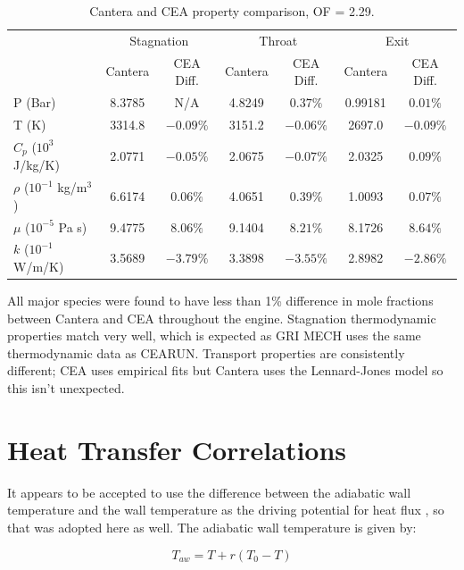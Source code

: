 \documentclass[11pt]{article}
\begin{document}
\begin{table}[H]
  \centering
  \caption{Cantera and CEA property comparison, OF = 2.29.}
  \begin{tabular}{l c c c c c c}
    \toprule
    & \multicolumn{2}{c}{Stagnation} & \multicolumn{2}{c}{Throat} & \multicolumn{2}{c}{Exit} \\
    \cmidrule(lr){2-3} \cmidrule(lr){4-5} \cmidrule(lr){6-7}
    & Cantera & CEA Diff. & Cantera & CEA Diff. & Cantera & CEA Diff. \\
    \midrule
    P (Bar) & 8.3785 & N/A & 4.8249 & $0.37\%$ & 0.99181 & $0.01\%$ \\
    T (K) & 3314.8 & $-0.09\%$ & 3151.2 & $-0.06\%$ & 2697.0 & $-0.09\%$ \\
    $C_p$ ($10^3$ J/kg/K) & 2.0771 & $-0.05\%$ & 2.0675 & $-0.07\%$ & 2.0325 & $0.09\%$ \\
    $\rho$ ($10^{-1}$ kg/m$^3$) & 6.6174 & $0.06\%$ & 4.0651 & $0.39\%$ & 1.0093 & $0.07\%$\\
    $\mu$ ($10^{-5}$ Pa s) & 9.4775 & $8.06\%$ & 9.1404 & $8.21\%$ & 8.1726 & $8.64\%$ \\
    $k$ ($10^{-1}$ W/m/K) & 3.5689 & $-3.79\%$ & 3.3898 & $-3.55\%$ & 2.8982 & $-2.86\%$\\
    \bottomrule
  \end{tabular}
\end{table}

All major species were found to have less than 1\% difference in mole fractions between Cantera and CEA throughout the engine. Stagnation thermodynamic properties match very well, which is expected as GRI MECH uses the same thermodynamic data as CEARUN. Transport properties are consistently different; CEA uses empirical fits but Cantera uses the Lennard-Jones model so this isn't unexpected.


\section{Heat Transfer Correlations}

It appears to be accepted to use the difference between the adiabatic wall temperature and the wall temperature as the driving potential for heat flux \cite{}, so that was adopted here as well. The adiabatic wall temperature is given by:

\begin{equation}
    T_{aw} = T + r(T_0 - T)
\end{equation}
\end{document}
